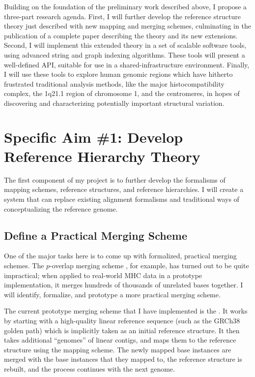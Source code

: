 \documentclass[11pt,proposal]{ucthesis}
\begin{document}
Building on the foundation of the preliminary work described above, I propose a three-part research agenda. First, I will further develop the reference structure theory just described with new mapping and merging schemes, culminating in the publication of a complete paper describing the theory and its new extensions. Second, I will implement this extended theory in a set of scalable software tools, using advanced string and graph indexing algorithms. These tools will present a well-defined API, suitable for use in a shared-infrastructure environment. Finally, I will use these tools to explore human genomic regions which have hitherto frustrated traditional analysis methods, like the major histocompatibility complex, the 1q21.1 region of chromosome 1, and the centromeres, in hopes of discovering and characterizing potentially important structural variation.

\section{Specific Aim \#1: Develop Reference Hierarchy Theory}

The first component of my project is to further develop the formalisms of mapping schemes, reference structures, and reference hierarchies. I will create a system that can replace existing alignment formalisms and traditional ways of conceptualizing the reference genome.

\subsection{Define a Practical Merging Scheme}
\label{subsec:aim1merging}

One of the major tasks here is to come up with formalized, practical merging schemes. The $p$-overlap merging scheme \cite{paten2014mapping}, for example, has turned out to be quite impractical; when applied to real-world MHC data in a prototype implementation, it merges hundreds of thousands of unrelated bases together. I will identify, formalize, and prototype a more practical merging scheme.

The current prototype merging scheme that I have implemented is the . It works by starting with a high-quality linear reference sequence (such as the GRCh38 golden path) which is implicitly taken as an initial reference structure. It then takes additional ``genomes'' of linear contigs, and maps them to the reference structure using the mapping scheme. The newly mapped base instances are merged with the base instances that they mapped to, the reference structure is rebuilt, and the process continues with the next genome. 
\end{document}
